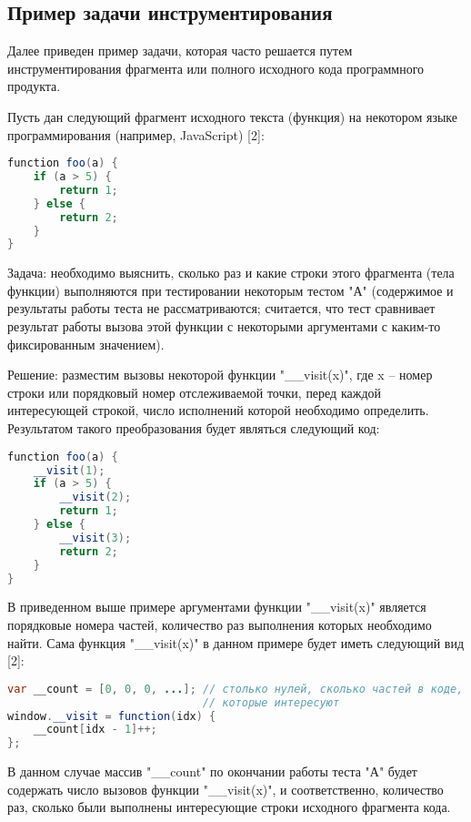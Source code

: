 \subsection{Пример задачи инструментирования}
Далее приведен пример задачи, которая часто решается путем инструментирования фрагмента или полного исходного кода программного продукта.

Пусть дан следующий фрагмент исходного текста (функция) на некотором языке программирования (например, JavaScript) [2]:

\begin{lstlisting}[frame=single, language=Java]
function foo(a) {
    if (a > 5) {
        return 1;
    } else {
        return 2;
    }
}
\end{lstlisting}

Задача: необходимо выяснить, сколько раз и какие строки этого фрагмента (тела функции) выполняются при тестировании некоторым тестом "А" (содержимое и результаты работы теста не рассматриваются; считается, что тест сравнивает результат работы вызова этой функции с некоторыми аргументами с каким-то фиксированным значением).

Решение: разместим вызовы некоторой функции "\_\_visit(x)", где x -- номер строки или порядковый номер отслеживаемой точки, перед каждой интересующей строкой, число исполнений которой необходимо определить. Результатом такого преобразования будет являться следующий код:

\begin{lstlisting}[frame=single, language=Java]
function foo(a) {
    __visit(1);
    if (a > 5) {
        __visit(2);
        return 1;
    } else {
        __visit(3);
        return 2;
    }
}
\end{lstlisting}

В приведенном выше примере аргументами функции "\_\_visit(x)" является порядковые номера частей, количество раз выполнения которых необходимо найти.
Сама функция "\_\_visit(x)" в данном примере будет иметь следующий вид [2]:

\begin{lstlisting}[frame=single, language=Java]
var __count = [0, 0, 0, ...]; // столько нулей, сколько частей в коде,
                              // которые интересуют
window.__visit = function(idx) {
    __count[idx - 1]++;
};
\end{lstlisting}

В данном случае массив "\_\_count" по окончании работы теста "А" будет содержать число вызовов функции "\_\_visit(x)", и соответственно, количество раз, сколько были выполнены интересующие строки исходного фрагмента кода.

